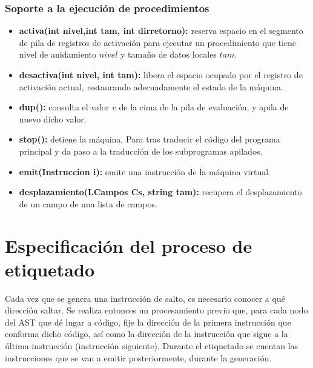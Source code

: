 \documentclass[11pt]{article}
\begin{document}
        \subsubsection*{Soporte a la ejecución de procedimientos}
            \begin{itemize}
                \item \textbf{activa(int nivel,int tam, int dirretorno):} reserva espacio en el segmento de pila de registros de activación para ejecutar un procedimiento que tiene nivel de anidamiento $nivel$ y tamaño de datos locales $tam$.
                \item \textbf{desactiva(int nivel, int tam):} libera el espacio ocupado por el registro de activación actual, restaurando adecuadamente el estado de la máquina.
                \item \textbf{dup():} consulta el valor $v$ de la cima de la pila de evaluación, y apila de nuevo dicho valor.
                \item \textbf{stop():} detiene la máquina. Para tras traducir el código del programa principal y da paso a la traducción de los subprogramas apilados.
                \item \textbf{emit(Instruccion i):} emite una instrucción de la máquina virtual.
                \item \textbf{desplazamiento(LCampos Cs, string tam):} recupera el desplazamiento de un campo de una lista de campos.
            \end{itemize}
        
    \section{Especificación del proceso de etiquetado}
    Cada vez que se genera una instrucción de salto, es necesario conocer a qué dirección saltar. Se realiza entonces un procesamiento previo que, para cada nodo del AST que dé lugar a código, fije la dirección de la primera instrucción que conforma dicho código, así como la dirección de la instrucción que sigue a la última instrucción (instrucción siguiente). Durante el  etiquetado se cuentan las instrucciones que se van a
    emitir posteriormente, durante la generación.
    
\end{document}
